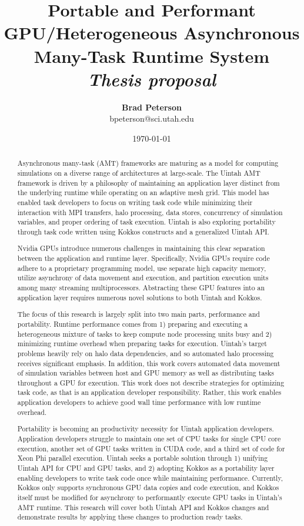 \documentclass[12pt]{article}
\title{{\bf Portable and Performant GPU/Heterogeneous Asynchronous Many-Task Runtime System} \\
\it Thesis proposal}
\author{ {\bf Brad Peterson}  \\
{\small bpeterson@sci.utah.edu}
}
\date{\today}
\begin{document}
\pagestyle{plain}
\maketitle

\pagebreak
\begin{abstract}

Asynchronous many-task (AMT) frameworks are maturing as a model for computing simulations on a diverse range of architectures at large-scale.  The Uintah AMT framework is driven by a philosophy of maintaining an application layer distinct from the underlying runtime while operating on an adaptive mesh grid.  This model has enabled task developers to focus on writing task code while minimizing their interaction with MPI transfers, halo processing, data stores, concurrency of simulation variables, and proper ordering of task execution.   Uintah is also exploring portability through task code written using Kokkos constructs and a generalized Uintah API.  

Nvidia GPUs introduce numerous challenges in maintaining this clear separation between the application and runtime layer.  Specifically, Nvidia GPUs require code adhere to a proprietary programming model, use separate high capacity memory, utilize asynchrony of data movement and execution, and partition execution units among many streaming multiprocessors.  Abstracting these GPU features into an application layer requires numerous novel solutions to both Uintah and Kokkos.  

The focus of this research is largely split into two main parts, performance and portability.  Runtime performance comes from 1) preparing and executing a heterogeneous mixture of tasks to keep compute node processing units busy and 2) minimizing runtime overhead when preparing tasks for execution.  Uintah's target problems heavily rely on halo data dependencies, and so automated halo processing receives significant emphasis.  In addition, this work covers automated data movement of simulation variables between host and GPU memory as well as distributing tasks throughout a GPU for execution.   This work does not describe strategies for optimizing task code, as that is an application developer responsibility.  Rather, this work enables application developers to achieve good wall time performance with low runtime overhead.   

Portability is becoming an productivity necessity for Uintah application developers.  Application developers struggle to maintain one set of CPU tasks for single CPU core execution, another set of GPU tasks written in CUDA code, and a third set of code for Xeon Phi parallel execution.  Uintah seeks a portable solution through 1) unifying Uintah API for CPU and GPU tasks, and 2) adopting Kokkos as a portability layer enabling developers to write task code once while maintaining performance. Currently, Kokkos only supports synchronous GPU data copies and code execution, and Kokkos itself must be modified for asynchrony to performantly execute GPU tasks in Uintah's AMT runtime.  This research will cover both Uintah API and Kokkos changes and demonstrate results by applying these changes to production ready tasks.  
   

\end{abstract}
\end{document}
